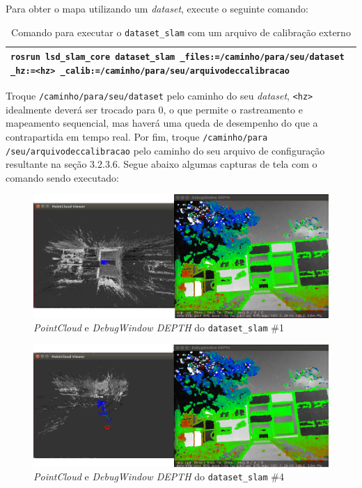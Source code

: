 Para obter o mapa utilizando um \textit{dataset}, execute o seguinte comando:

\begin{table}[H]\label{tb:16}
\begin{tabular}{| p{\textwidth}|}
\hline
\texttt{rosrun lsd\_slam\_core dataset\_slam \_files:=/caminho/para/seu/dataset \_hz:=<hz> \_calib:=/caminho/para/seu/arquivodeccalibracao}\\
\hline
\end{tabular}
\caption{Comando para executar o \texttt{dataset\_slam} com um arquivo de calibração externo}
\end{table}

Troque \texttt{/caminho/para/seu/dataset} pelo caminho do seu \textit{dataset}, \texttt{<hz>} idealmente deverá ser trocado para 0, o que permite o rastreamento e mapeamento sequencial, mas haverá uma queda de desempenho do que a contrapartida em tempo real. Por fim, troque \texttt{/caminho/para}\\ \texttt{/seu/arquivodeccalibracao} pelo caminho do seu arquivo de configuração resultante na seção 3.2.3.6. Segue abaixo algumas capturas de tela com o comando sendo executado:

\begin{figure}[H]
	\centering
		\includegraphics[width= \textwidth]{Imagens/figura3-26E3-27.png}
	\caption{\textit{PointCloud} e \textit{DebugWindow DEPTH} do \texttt{dataset\_slam} \#1}
	\label{fig3:26}
\end{figure}





\begin{figure}[H]
	\centering
		\includegraphics[width= \textwidth]{Imagens/figura3-28E3-29.png}
	\caption{\textit{PointCloud} e \textit{DebugWindow DEPTH} do \texttt{dataset\_slam} \#4}
	\label{fig3:27}
\end{figure}


